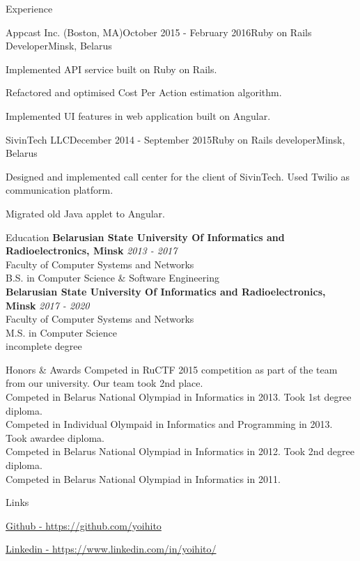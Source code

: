 \documentclass{resume}
\begin{document}
\begin{rSection}{Experience}
    \begin{rSubsection}{Appcast Inc. (Boston, MA)}{October 2015 - February 2016}{Ruby on Rails Developer}{Minsk, Belarus}
    \item Implemented API service built on Ruby on Rails.
    \item Refactored and optimised Cost Per Action estimation algorithm.
    \item Implemented UI features in web application built on Angular.
    \end{rSubsection}

    \begin{rSubsection}{SivinTech LLC}{December 2014 - September 2015}{Ruby on Rails developer}{Minsk, Belarus}
    \item Designed and implemented call center for the client of SivinTech. Used Twilio as communication platform.
    \item Migrated old Java applet to Angular.
    \end{rSubsection}
  \end{rSection}

  \begin{rSection}{Education}
    {\bf Belarusian State University Of Informatics and Radioelectronics, Minsk} \hfill {\em 2013 - 2017} \\
    { Faculty of Computer Systems and Networks } \\
    { B.S. in Computer Science \& Software Engineering } \\
    {\bf Belarusian State University Of Informatics and Radioelectronics, Minsk} \hfill {\em 2017 - 2020} \\
    { Faculty of Computer Systems and Networks } \\
    { M.S. in Computer Science } \\
    { incomplete degree } \\
  \end{rSection}

  \begin{rSection}{Honors \& Awards}
  {Competed in RuCTF 2015 competition as part of the team from our university. Our team took 2nd place.} \\
  {Competed in Belarus National Olympiad in Informatics in 2013. Took 1st degree diploma.} \\
  {Competed in Individual Olympaid in Informatics and Programming in 2013. Took awardee diploma.} \\
  {Competed in Belarus National Olympiad in Informatics in 2012. Took 2nd degree diploma.} \\
  {Competed in Belarus National Olympiad in Informatics in 2011.}
  \end{rSection}

  \begin{rSection}{Links}
  \item \href{https://github.com/yoihito}{Github - https://github.com/yoihito}
  \item \href{https://www.linkedin.com/in/yoihito/}{Linkedin - https://www.linkedin.com/in/yoihito/}
  \end{rSection}
\end{document}
